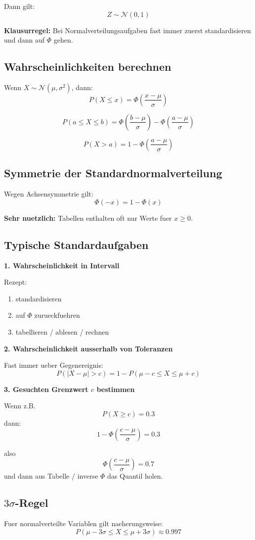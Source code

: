 \documentclass[a4paper,11pt]{article}
\begin{document}
Dann gilt:
\[
Z\sim \mathcal N(0,1)
\]

\textbf{Klausurregel:}
Bei Normalverteilungsaufgaben fast immer zuerst standardisieren und dann auf $\Phi$ gehen.

\subsection{Wahrscheinlichkeiten berechnen}
Wenn $X\sim \mathcal N(\mu,\sigma^2)$, dann:
\[
P(X\le x)=\Phi\left(\frac{x-\mu}{\sigma}\right)
\]

\[
P(a\le X\le b)=\Phi\left(\frac{b-\mu}{\sigma}\right)-\Phi\left(\frac{a-\mu}{\sigma}\right)
\]

\[
P(X>a)=1-\Phi\left(\frac{a-\mu}{\sigma}\right)
\]

\subsection{Symmetrie der Standardnormalverteilung}
Wegen Achsensymmetrie gilt:
\[
\Phi(-x)=1-\Phi(x)
\]

\textbf{Sehr nuetzlich:}
Tabellen enthalten oft nur Werte fuer $x\ge 0$.

\subsection{Typische Standardaufgaben}
\textbf{1. Wahrscheinlichkeit in Intervall}

Rezept:
\begin{enumerate}
  \item standardisieren
  \item auf $\Phi$ zurueckfuehren
  \item tabellieren / ablesen / rechnen
\end{enumerate}

\textbf{2. Wahrscheinlichkeit ausserhalb von Toleranzen}

Fast immer ueber Gegenereignis:
\[
P(|X-\mu|>c)=1-P(\mu-c\le X\le \mu+c)
\]

\textbf{3. Gesuchten Grenzwert $c$ bestimmen}

Wenn z.B.
\[
P(X\ge c)=0.3
\]
dann:
\[
1-\Phi\left(\frac{c-\mu}{\sigma}\right)=0.3
\]

also
\[
\Phi\left(\frac{c-\mu}{\sigma}\right)=0.7
\]
und dann aus Tabelle / inverse $\Phi$ das Quantil holen.

\subsection{$3\sigma$-Regel}
Fuer normalverteilte Variablen gilt naeherungsweise:
\[
P(\mu-3\sigma\le X\le \mu+3\sigma)\approx 0.997
\]
\end{document}

